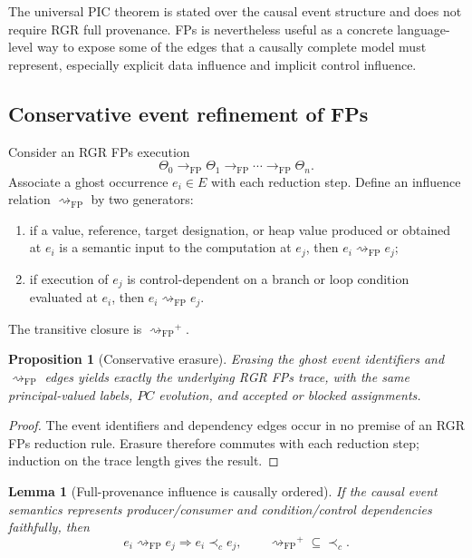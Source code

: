 \documentclass[10pt,twocolumn]{article}
\newcommand{\FP}{\mathrm{FP}}
\newcommand{\Influence}{\mathrel{\rightsquigarrow_{\!\FP}}}
\newcommand{\hb}{\prec_{c}}
\newtheorem{proposition}{Proposition}
\newtheorem{lemma}{Lemma}
\begin{document}
The universal PIC theorem is stated over the causal event structure and does
not require RGR full provenance.  FPs is nevertheless useful as a concrete
language-level way to expose some of the edges that a causally complete model
must represent, especially explicit data influence and implicit control
influence.

\subsection{Conservative event refinement of FPs}

Consider an RGR FPs execution
\begin{equation}
  \Theta_0\to_{\FP}\Theta_1\to_{\FP}\cdots\to_{\FP}\Theta_n.
  \label{eq:fp-trace}
\end{equation}
Associate a ghost occurrence $e_i\in E$ with each reduction step.  Define an
influence relation $\Influence$ by two generators:
\begin{enumerate}[label=(F\arabic*),leftmargin=*]
  \item if a value, reference, target designation, or heap value produced or
        obtained at $e_i$ is a semantic input to the computation at $e_j$,
        then $e_i\Influence e_j$;
  \item if execution of $e_j$ is control-dependent on a branch or loop
        condition evaluated at $e_i$, then $e_i\Influence e_j$.
\end{enumerate}
The transitive closure is $\Influence^{+}$.

\begin{proposition}[Conservative erasure]
Erasing the ghost event identifiers and $\Influence$ edges yields exactly the
underlying RGR FPs trace, with the same principal-valued labels, $PC$ evolution,
and accepted or blocked assignments.
\end{proposition}

\begin{proof}
The event identifiers and dependency edges occur in no premise of an RGR FPs
reduction rule.  Erasure therefore commutes with each reduction step; induction
on the trace length gives the result.
\end{proof}

\begin{lemma}[Full-provenance influence is causally ordered]
\label{lem:fp-causal}
If the causal event semantics represents producer/consumer and
condition/control dependencies faithfully, then
\begin{equation}
  e_i\Influence e_j\Longrightarrow e_i\hb e_j,
  \qquad
  \Influence^{+}\subseteq\hb.
  \label{eq:fp-suborder}
\end{equation}
\end{lemma}
\end{document}
